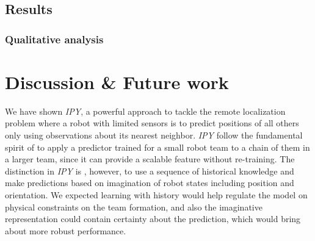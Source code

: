 \documentclass[letterpaper, 10 pt, conference]{ieeeconf}  %
\begin{document}
	
	
	\subsection{Results} 
	\label{sec:results}
	
	
	\subsubsection{Qualitative analysis} 
	\label{sec:qualitative_analaysis} 

	
		

	\section{Discussion \& Future work}
	\label{sec:discussion_and_future_work}
	
	We have shown \emph{IPY}, a powerful approach to tackle the remote localization problem 
	where a robot with limited sensors is to predict positions of all others only using 
	observations about its nearest neighbor. 
	\emph{IPY} follow the fundamental spirit of \cite{Choi17} to apply a predictor 
	trained for a small robot team to a chain of them in a larger team, since it 
	can provide a scalable feature without re-training.   
	The distinction in \emph{IPY} is , however, to use a sequence of historical knowledge and 
	make predictions based on imagination of robot states including position and orientation.
	We expected learning with history would help regulate the model on physical constraints on 
	the team formation, and also the imaginative representation could contain 
	certainty about the prediction, which would bring about more robust performance. 
	
\end{document}
